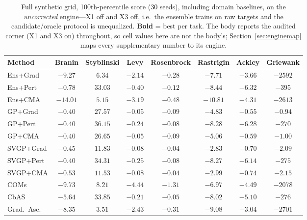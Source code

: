 \documentclass[letterpaper]{article}
\theoremstyle{plain}
\begin{document}
\begin{table}[t]\centering
\caption{Full synthetic grid, 100th-percentile score (30 seeds), including domain baselines, on the \emph{uncorrected} engine---X1 off and X3 off, i.e.\ the ensemble trains on raw targets and the candidate/oracle protocol is unequalized. \textbf{Bold} = best per task. The body reports the audited corner (X1 and X3 on) throughout, so cell values here are not the body's; Section~\ref{sec:enginemap} maps every supplementary number to its engine.}
\label{tab:sfull}
\setlength{\tabcolsep}{5pt}\small
\begin{tabular}{lccccccc}
\toprule
Method & Branin & Styblinski & Levy & Rosenbrock & Rastrigin & Ackley & Griewank \\
\midrule
Ens+Grad & $-9.27$ & $6.34$ & $-2.14$ & $-0.28$ & $-7.71$ & $-3.66$ & $-2592$ \\
Ens+Pert & $-0.78$ & $33.03$ & $-0.40$ & $-0.12$ & $-8.44$ & $-6.32$ & $-395$ \\
Ens+CMA & $-14.01$ & $5.15$ & $-3.19$ & $-0.48$ & $-10.81$ & $-4.31$ & $-2613$ \\
GP+Grad & $\mathbf{-0.40}$ & $27.57$ & $\mathbf{-0.05}$ & $-0.09$ & $-4.83$ & $\mathbf{-0.55}$ & $\mathbf{-0.94}$ \\
GP+Pert & $-0.40$ & $\mathbf{36.15}$ & $-0.24$ & $-0.08$ & $-8.28$ & $-6.28$ & $-270$ \\
GP+CMA & $-0.40$ & $26.65$ & $-0.05$ & $-0.09$ & $-5.06$ & $-0.59$ & $-1.00$ \\
SVGP+Grad & $-0.45$ & $11.83$ & $-0.08$ & $\mathbf{-0.04}$ & $\mathbf{-2.83}$ & $-0.70$ & $-2.09$ \\
SVGP+Pert & $-0.40$ & $34.31$ & $-0.25$ & $-0.08$ & $-8.27$ & $-6.14$ & $-275$ \\
SVGP+CMA & $-0.53$ & $11.53$ & $-0.08$ & $-0.04$ & $-2.99$ & $-0.74$ & $-2.15$ \\
COMs & $-9.73$ & $8.21$ & $-4.44$ & $-1.31$ & $-6.97$ & $-4.49$ & $-2078$ \\
CbAS & $-5.64$ & $33.85$ & $-0.21$ & $-0.05$ & $-8.02$ & $-5.10$ & $-276$ \\
Grad.\ Asc. & $-8.35$ & $3.51$ & $-2.43$ & $-0.31$ & $-9.08$ & $-3.04$ & $-2701$ \\
\bottomrule
\end{tabular}
\end{table}
\end{document}
